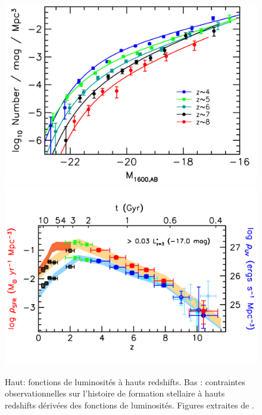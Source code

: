 



\begin{figure}
		\includegraphics[width=.95\linewidth]{img/01/UV_lum_obs.pdf} 
        \includegraphics[width=.95\linewidth]{img/01/SFR_obs.pdf} 
        \caption[Contrainte SFH]{Haut: fonctions de luminosités à hauts redshifts. 
        Bas : contraintes observationnelles sur l'histoire de formation stellaire à hauts redshifts dérivées des fonctions de luminosités. 
        Figures extraites de \cite{bouwens_reionization_2015}.
 		\label{fig:obs}}
\end{figure}


